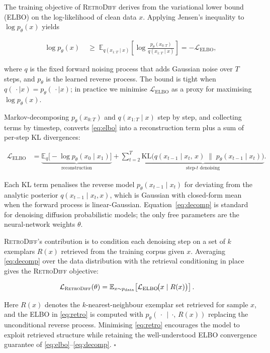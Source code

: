 \documentclass[11pt]{article}
\newcommand{\RetroDiff}{\textsc{RetroDiff}\xspace}
\newcommand{\Lcal}{\mathcal{L}}
\newcommand{\Ecal}{\mathbb{E}}
\newcommand{\pdata}{p_{\mathrm{data}}}
\newcommand{\ptheta}{p_\theta}
\newcommand{\ELBO}{\mathrm{ELBO}}
\newcommand{\KL}{\mathrm{KL}}
\begin{document}
\noindent
The training objective of \RetroDiff derives from the variational lower bound (ELBO)
on the log-likelihood of clean data $x$.
Applying Jensen's inequality to $\log \ptheta(x)$ yields

\begin{align}
  \log \ptheta(x)
    &\;\geq\;
    \Ecal_{q(x_{1:T}\mid x)}\!\left[
      \log\frac{\ptheta(x_{0:T})}{q(x_{1:T}\mid x)}
    \right]
    = -\Lcal_{\ELBO},
  \label{eq:elbo}
\end{align}

\noindent
where $q$ is the fixed forward noising process that adds Gaussian noise over $T$ steps,
and $\ptheta$ is the learned reverse process.
The bound is tight when $q(\,\cdot\mid x)=\ptheta(\,\cdot\mid x)$;
in practice we minimise $\Lcal_{\ELBO}$ as a proxy for maximising $\log\ptheta(x)$.

Markov-decomposing $\ptheta(x_{0:T})$ and $q(x_{1:T}\mid x)$ step by step,
and collecting terms by timestep, converts \eqref{eq:elbo} into
a reconstruction term plus a sum of per-step KL divergences:

\begin{align}
  \Lcal_{\ELBO}
    &= \underbrace{\Ecal_q\!\bigl[-\log \ptheta(x_0\mid x_1)\bigr]}_{\text{reconstruction}}
     + \sum_{t=2}^{T}
       \underbrace{
         \KL\!\bigl(
           q(x_{t-1}\mid x_t,\,x)
           \;\|\;
           \ptheta(x_{t-1}\mid x_t)
         \bigr)
       }_{\text{step-}t\text{ denoising}}.
  \label{eq:decomp}
\end{align}

\noindent
Each KL term penalises the reverse model $\ptheta(x_{t-1}\mid x_t)$
for deviating from the analytic posterior
$q(x_{t-1}\mid x_t,x)$, which is Gaussian with closed-form mean
when the forward process is linear-Gaussian.
Equation~\eqref{eq:decomp} is standard for denoising diffusion probabilistic models;
the only free parameters are the neural-network weights $\theta$.

\RetroDiff's contribution is to condition each denoising step on a set of
$k$ exemplars $R(x)$ retrieved from the training corpus given $x$.
Averaging \eqref{eq:decomp} over the data distribution
with the retrieval conditioning in place gives the \RetroDiff objective:

\begin{align}
  \Lcal_{\RetroDiff}(\theta)
    &= \Ecal_{x\sim\pdata}\!\left[
        \Lcal_{\ELBO}\!\bigl(x \mid R(x)\bigr)
       \right].
  \label{eq:retro}
\end{align}

\noindent
Here $R(x)$ denotes the $k$-nearest-neighbour exemplar set retrieved for sample $x$,
and the ELBO in \eqref{eq:retro} is computed with $\ptheta(\,\cdot\,\mid\,\cdot,\,R(x))$
replacing the unconditional reverse process.
Minimising \eqref{eq:retro} encourages the model to exploit retrieved structure
while retaining the well-understood ELBO convergence guarantee of
\eqref{eq:elbo}--\eqref{eq:decomp}. \hfill$\square$
\end{document}
